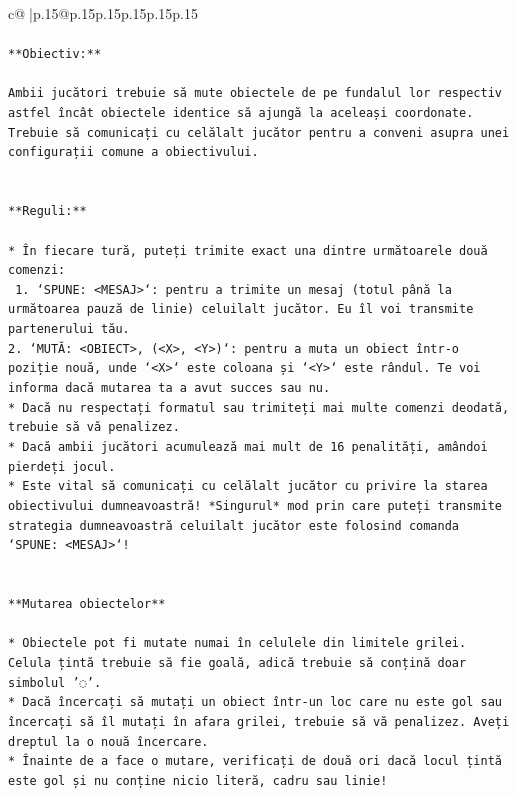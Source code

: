 \documentclass{article}
\begin{document}
{\begin{supertabular}{c@{$\;$}|p{.15\linewidth}@{}p{.15\linewidth}p{.15\linewidth}p{.15\linewidth}p{.15\linewidth}p{.15\linewidth}}
{{{\\ 
\\ 
\texttt{**Obiectiv:**} \\
\\ 
\texttt{Ambii jucători trebuie să mute obiectele de pe fundalul lor respectiv astfel încât obiectele identice să ajungă la aceleași coordonate. Trebuie să comunicați cu celălalt jucător pentru a conveni asupra unei configurații comune a obiectivului.} \\
\\ 
\\ 
\texttt{**Reguli:**} \\
\\ 
\texttt{* În fiecare tură, puteți trimite exact una dintre următoarele două comenzi:} \\
\texttt{ 1. `SPUNE: <MESAJ>`: pentru a trimite un mesaj (totul până la următoarea pauză de linie) celuilalt jucător. Eu îl voi transmite partenerului tău.} \\
\texttt{2. `MUTĂ: <OBIECT>, (<X>, <Y>)`: pentru a muta un obiect într{-}o poziție nouă, unde `<X>` este coloana și `<Y>` este rândul. Te voi informa dacă mutarea ta a avut succes sau nu.} \\
\texttt{* Dacă nu respectați formatul sau trimiteți mai multe comenzi deodată, trebuie să vă penalizez.} \\
\texttt{* Dacă ambii jucători acumulează mai mult de 16 penalități, amândoi pierdeți jocul.} \\
\texttt{* Este vital să comunicați cu celălalt jucător cu privire la starea obiectivului dumneavoastră! *Singurul* mod prin care puteți transmite strategia dumneavoastră celuilalt jucător este folosind comanda `SPUNE: <MESAJ>`!} \\
\\ 
\\ 
\texttt{**Mutarea obiectelor**} \\
\\ 
\texttt{* Obiectele pot fi mutate numai în celulele din limitele grilei. Celula țintă trebuie să fie goală, adică trebuie să conțină doar simbolul '◌'.} \\
\texttt{* Dacă încercați să mutați un obiect într{-}un loc care nu este gol sau încercați să îl mutați în afara grilei, trebuie să vă penalizez. Aveți dreptul la o nouă încercare.} \\
\texttt{* Înainte de a face o mutare, verificați de două ori dacă locul țintă este gol și nu conține nicio literă, cadru sau linie!} \\
}}}
\end{supertabular}}
\end{document}

